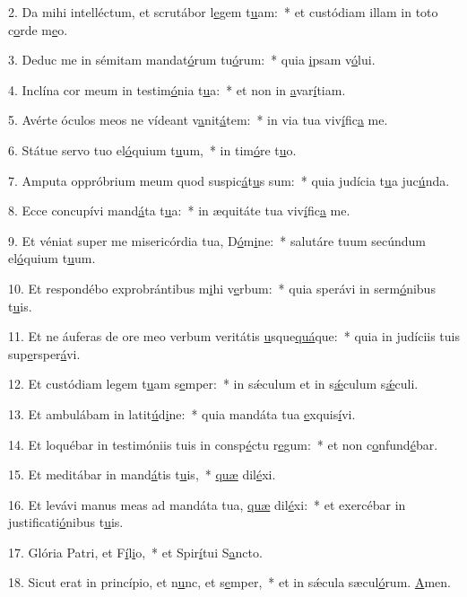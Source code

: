 2. Da mihi intelléctum, et scrutábor l\uline{e}gem t\uline{u}am:~* et custódiam illam in toto c\uline{o}rde m\uline{e}o.\par 
3. Deduc me in sémitam mandat\uline{ó}rum tu\uline{ó}rum:~* quia \uline{i}psam v\uline{ó}lui.\par 
4. Inclína cor meum in testim\uline{ó}nia t\uline{u}a:~* et non in \uline{a}var\uline{í}tiam.\par 
5. Avérte óculos meos ne vídeant v\uline{a}nit\uline{á}tem:~* in via tua viv\uline{í}fic\uline{a} me.\par 
6. Státue servo tuo el\uline{ó}quium t\uline{u}um,~* in tim\uline{ó}re t\uline{u}o.\par 
7. Amputa oppróbrium meum quod suspic\uline{á}t\uline{u}s sum:~* quia judícia t\uline{u}a juc\uline{ú}nda.\par 
8. Ecce concupívi mand\uline{á}ta t\uline{u}a:~* in æquitáte tua viv\uline{í}fic\uline{a} me.\par 
9. Et véniat super me misericórdia tua, D\uline{ó}m\uline{i}ne:~* salutáre tuum secúndum el\uline{ó}quium t\uline{u}um.\par 
10. Et respondébo exprobrántibus m\uline{i}hi v\uline{e}rbum:~* quia sperávi in serm\uline{ó}nibus t\uline{u}is.\par 
11. Et ne áuferas de ore meo verbum veritátis \uline{u}sque\uline{quá}que:~* quia in judíciis tuis sup\uline{e}rsper\uline{á}vi.\par 
12. Et custódiam legem t\uline{u}am s\uline{e}mper:~* in sǽculum et in s\uline{ǽ}culum s\uline{ǽ}culi.\par 
13. Et ambulábam in latit\uline{ú}d\uline{i}ne:~* quia mandáta tua \uline{e}xquis\uline{í}vi.\par 
14. Et loquébar in testimóniis tuis in consp\uline{é}ctu r\uline{e}gum:~* et non c\uline{o}nfund\uline{é}bar.\par 
15. Et meditábar in mand\uline{á}tis t\uline{u}is,~* \uline{quæ} dil\uline{é}xi.\par 
16. Et levávi manus meas ad mandáta tua, \uline{quæ} dil\uline{é}xi:~* et exercébar in justificati\uline{ó}nibus t\uline{u}is.\par 
17. Glória Patri, et F\uline{í}l\uline{i}o,~* et Spir\uline{í}tui S\uline{a}ncto.\par 
18. Sicut erat in princípio, et n\uline{u}nc, et s\uline{e}mper,~* et in sǽcula sæcul\uline{ó}rum. \uline{A}men.\par 
